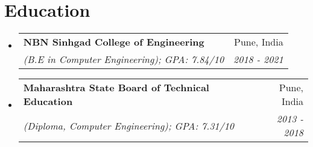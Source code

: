 \documentclass[letterpaper,11pt]{article}
\makeatletter
\newcommand{\resumeSubheading}[4]{
  \vspace{-1pt}\item
    \begin{tabular*}{0.97\textwidth}{l@{\extracolsep{\fill}}r}
      \textbf{#1} & #2 \\
      \textit{\small#3} & \textit{\small #4} \\
    \end{tabular*}\vspace{-5pt}
}
\newcommand{\resumeSubHeadingListStart}{\begin{itemize}[leftmargin=*]}
\newcommand{\resumeSubHeadingListEnd}{\end{itemize}}
\makeatother
\begin{document}
\section{Education}
  \resumeSubHeadingListStart
    \resumeSubheading
      {NBN Sinhgad College of Engineering}{Pune, India}
      {(B.E in Computer Engineering);  GPA: 7.84/10 }{2018 - 2021}
    \resumeSubheading
      {Maharashtra State Board of Technical Education}{Pune, India}
      {(Diploma, Computer Engineering);  GPA: 7.31/10 }{2013 - 2018}
  \resumeSubHeadingListEnd
\end{document}

